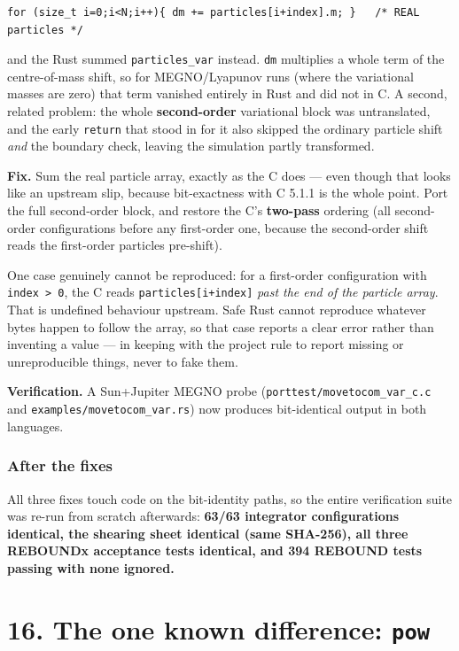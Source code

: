 \documentclass[11pt]{article}
\begin{document}
\begin{lstlisting}
for (size_t i=0;i<N;i++){ dm += particles[i+index].m; }   /* REAL particles */
\end{lstlisting}

and the Rust summed \texttt{particles\_var} instead. \texttt{dm} multiplies a whole term of the centre-of-mass shift, so for MEGNO/Lyapunov runs (where the variational masses are zero) that term vanished entirely in Rust and did not in C. A second, related problem: the whole \textbf{second-order} variational block was untranslated, and the early \texttt{return} that stood in for it also skipped the ordinary particle shift \emph{and} the boundary check, leaving the simulation partly transformed.

\textbf{Fix.} Sum the real particle array, exactly as the C does --- even though that looks like an upstream slip, because bit-exactness with C 5.1.1 is the whole point. Port the full second-order block, and restore the C's \textbf{two-pass} ordering (all second-order configurations before any first-order one, because the second-order shift reads the first-order particles pre-shift).

One case genuinely cannot be reproduced: for a first-order configuration with \texttt{index > 0}, the C reads \texttt{particles[i+index]} \emph{past the end of the particle array}. That is undefined behaviour upstream. Safe Rust cannot reproduce whatever bytes happen to follow the array, so that case reports a clear error rather than inventing a value --- in keeping with the project rule to report missing or unreproducible things, never to fake them.

\textbf{Verification.} A Sun+Jupiter MEGNO probe (\texttt{porttest/movetocom\_var\_c.c} and \texttt{examples/movetocom\_var.rs}) now produces bit-identical output in both languages.

\subsubsection{After the fixes}

All three fixes touch code on the bit-identity paths, so the entire verification suite was re-run from scratch afterwards: \textbf{63/63 integrator configurations identical, the shearing sheet identical (same SHA-256), all three REBOUNDx acceptance tests identical, and 394 REBOUND tests passing with none ignored.}

\section{16. The one known difference: \texttt{pow}}
\end{document}
